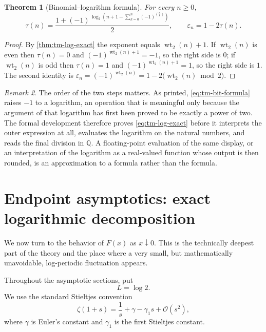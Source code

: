 \documentclass[11pt,oneside]{article}
\newtheorem{theorem}{Theorem}[section]
\theoremstyle{definition}
\theoremstyle{remark}
\newtheorem{remark}[theorem]{Remark}
\newcommand{\Q}{\mathbb Q}
\newcommand{\wt}{\operatorname{wt}_2}
\newcommand{\bigO}{\mathcal O}
\begin{document}
\begin{theorem}[Binomial--logarithm formula]
\label{thm:tm-bit-formula}
For every $n\ge0$,
\begin{equation}
 \tau(n)=\frac{1+(-1)^{\,\log_2\!\left(n+1-\sum_{k=0}^{n}(-1)^{\binom nk}\right)}}{2},
 \qquad
 \varepsilon_n=1-2\tau(n).                                 \label{eq:tm-bit-formula}
\end{equation}
\end{theorem}

\begin{proof}
By \cref{thm:tm-log-exact} the exponent equals $\wt(n)+1$.  If $\wt(n)$ is even then
$\tau(n)=0$ and $(-1)^{\wt(n)+1}=-1$, so the right side is $0$; if $\wt(n)$ is odd then
$\tau(n)=1$ and $(-1)^{\wt(n)+1}=1$, so the right side is $1$.  The second identity is
$\varepsilon_n=(-1)^{\wt(n)}=1-2\bigl(\wt(n)\bmod2\bigr)$.
\end{proof}

\begin{remark}
The order of the two steps matters.  As printed, \eqref{eq:tm-bit-formula} raises $-1$ to a
logarithm, an operation that is meaningful only because the argument of that logarithm has
first been proved to be exactly a power of two.  The formal development therefore proves
\eqref{eq:tm-log-exact} before it interprets the outer expression at all, evaluates the
logarithm on the natural numbers, and reads the final division in $\Q$.  A floating-point
evaluation of the same display, or an interpretation of the logarithm as a real-valued
function whose output is then rounded, is an approximation to a formula rather than the
formula.
\end{remark}

\section{Endpoint asymptotics: exact logarithmic decomposition}
\label{sec:asymptotic-decomposition}

We now turn to the behavior of $F(x)$ as $x\downarrow0$.  This is the technically deepest
part of the theory and the place where a very small, but mathematically unavoidable,
log-periodic fluctuation appears.

Throughout the asymptotic sections, put
\begin{equation}
 L=\log2.                                                   \label{eq:L-def}
\end{equation}
We use the standard Stieltjes convention
\begin{equation}
 \zeta(1+s)=\frac1s+\gamma-\gamma_1s+\bigO(s^2),           \label{eq:stieltjes-convention}
\end{equation}
where $\gamma$ is Euler's constant and $\gamma_1$ is the first Stieltjes constant.
\end{document}
